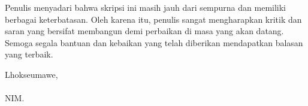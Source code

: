 Penulis menyadari bahwa skripsi ini masih jauh dari sempurna dan memiliki berbagai keterbatasan. Oleh karena itu, penulis sangat mengharapkan kritik dan saran yang bersifat membangun demi perbaikan di masa yang akan datang. Semoga segala bantuan dan kebaikan yang telah diberikan mendapatkan balasan yang terbaik.

\begin{flushright}
    Lhokseumawe, \tglpernyataan\\[1.25cm]
    \penulis \\
    NIM. \nim
\end{flushright}
